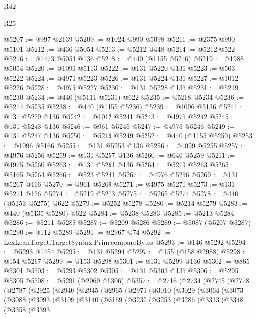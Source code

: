 \begin{lexlean}{R42}
\begin{lexlean}{R25}
\begin{coremodule}
{{{{{{{{{{{{{{{{{{{{{{{{{{{{{{{{{{{{{{{{{{{{{{{{{{{{{{{{{{{{{{{{{{{{{{{{{{{{{{{{{{{{{{{{{{{{{{{{{{{{{{{{{{{{{{{{{{{{{{{{{{{{{{{{{{{{{{{{{{{{{{{{{{{{{{{{{{{{{{{{{{{{{{{{{{{{{{{{{{{{{{{{{{{{{{{{{{{{{{{@5207 := @997 @2139
@5209 := @1024 @990 @5098
@5211 := @2375 @990 @5101
@5212 := @436 @5054
@5213 := @5212 @448
@5214 := @5212 @522
@5216 := @1473 @5054 @136
@5218 := @440 (@1155 @5216)
@5219 := @1988 @5054
@5220 := @1096 @5113
@5222 := @131 @5220 @136
@5223 := @563 @5222
@5224 := @4976 @5223
@5226 := @131 @5224 @136
@5227 := @1012 @5226
@5228 := @4975 @5227
@5230 := @131 @5228 @136
@5231 := @5219 @5230
@5234 := @440 (@5111 @5231) @622
@5235 := @5218 @5234
@5236 := @5214 @5235
@5238 := @440 (@1155 @5236)
@5239 := @1096 @5136
@5241 := @131 @5239 @136
@5242 := @1012 @5241
@5243 := @4976 @5242
@5245 := @131 @5243 @136
@5246 := @961 @5245
@5247 := @4975 @5246
@5249 := @131 @5247 @136
@5250 := @5219 @5249
@5252 := @440 (@1155 @5250)
@5253 := @1096 @5166
@5255 := @131 @5253 @136
@5256 := @1099 @5255
@5257 := @4976 @5256
@5259 := @131 @5257 @136
@5260 := @646 @5259
@5261 := @4975 @5260
@5263 := @131 @5261 @136
@5264 := @5219 @5263
@5265 := @5165 @5264
@5266 := @523 @5241
@5267 := @4976 @5266
@5269 := @131 @5267 @136
@5270 := @961 @5269
@5271 := @4975 @5270
@5273 := @131 @5271 @136
@5274 := @5219 @5273
@5275 := @5265 @5274
@5278 := @440 (@5153 @5275) @622
@5279 := @5252 @5278
@5280 := @5214 @5279
@5283 := @440 (@5135 @5280) @622
@5284 := @5238 @5283
@5285 := @5213 @5284
@5286 := @5211 @5285
@5287 := @5209 @5286
@5289 := @5087 (@5207 @5287)
@5290 := @112 @5289
@5291 := @2967 @74
@5292 := LexLeanTarget.TargetSyntax.Prim.compareBytes
@5293 := @146 @5292
@5294 := @5293 @1454
@5295 := @131 @5294
@5297 := @155 (@158 @2988)
@5298 := @154 @5297
@5299 := @153 @5298
@5301 := @131 @5299 @136
@5302 := @865 @5301
@5303 := @5293 @5302
@5305 := @131 @5303 @136
@5306 := @5295 @5305
@5308 := @5291 (@2069 @5306)
@5357 := @2716
    (@2734
      (@2745
        (@2778
          (@2787
            (@2925
              (@2940
                (@2945
                  (@2965
                    (@2971
                      (@3010
                        (@3029
                          (@3064
                            (@3073
                              (@3088
                                (@3093
                                  (@3109
                                    (@3140
                                      (@3169
                                        (@3232
                                          (@3253
                                            (@3286
                                              (@3313
                                                (@3348
                                                  (@3358
                                                    (@3393
}}}}}}}}}}}}}}}}}}}}}}}}}}}}}}}}}}}}}}}}}}}}}}}}}}}}}}}}}}}}}}}}}}}}}}}}}}}}}}}}}}}}}}}}}}}}}}}}}}}}}}}}}}}}}}}}}}}}}}}}}}}}}}}}}}}}}}}}}}}}}}}}}}}}}}}}}}}}}}}}}}}}}}}}}}}}}}}}}}}}}}}}}}}}}}}}}}}}}}}
\end{coremodule}
\end{lexlean}
\end{lexlean}
